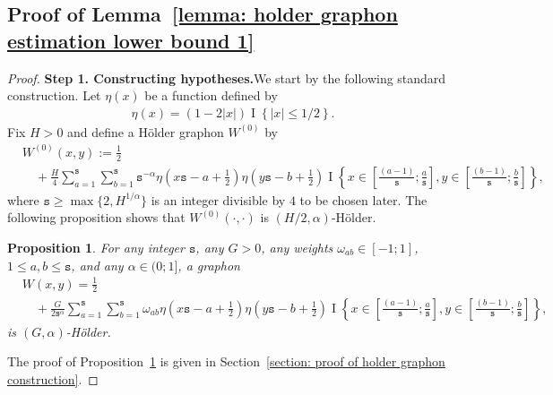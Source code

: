 \documentclass[11pt]{article}
\newcommand{\indicator}[1]{{\operatorname{I} \left \{ #1\right \}}}
\newcommand{\<}{\langle}
\renewcommand{\>}{\rangle}
\newcommand{\ts}{\mathtt{s}}
\theoremstyle{plain}
\newtheorem{prop}{Proposition}
\theoremstyle{definition}
\theoremstyle{remark}
\begin{document}
{\subsection{Proof of Lemma~\ref{lemma: holder graphon estimation lower bound 1}}

\begin{proof}
	\textbf{Step 1. Constructing hypotheses.}We start by the following standard construction. Let $\eta(x)$ be a function defined by
    \begin{align}
    \label{eq: eta definition}
        \eta(x) = (1 - 2|x|) \indicator{|x| \le 1/2}.
    \end{align}
	Fix $H>0$ and define a H\"older graphon $W^{(0)}$ by
	\begin{align*}
	& W^{(0)}(x,y) := \frac12 \\
    & \quad + \frac{H}{4} \sum_{a = 1}^{\ts} \sum_{b =1}^{\ts } \ts^{-\alpha} \eta \left (x\ts - a + \frac{1}{2} \right ) \eta \left ( y \ts - b + \frac{1}{2} \right ) \indicator{x \in \left  [\frac{(a - 1)}{\ts}; \frac{a}{\ts} \right ], y \in \left [\frac{(b - 1)}{\ts}; \frac{b}{\ts}\right ]},
	\end{align*}
    where $\ts \ge \max \{2, H^{1/\alpha}\}$ is an integer divisible by $4$ to be chosen later.
    The following proposition shows that $W^{(0)}(\cdot, \cdot)$ is $(H/2, \alpha)$-H\"older. 
    \begin{prop}
    \label{proposition: Holder graphons construction}
    For any integer $\ts$, any $G > 0$, any weights $\omega_{ab} \in [-1; 1]$, $1 \le a, b \le \ts$, and any $\alpha \in (0; 1]$, a graphon
    \begin{align*}
        & W(x, y) = \frac{1}{2} \\
        & \quad + \frac{G }{2 \ts^{\alpha}} \sum_{a = 1}^{\ts} \sum_{b = 1}^{\ts} \omega_{ab}  \eta \left (x\ts - a + \frac{1}{2} \right ) \eta \left ( y \ts - b + \frac{1}{2} \right ) \indicator{x \in \left  [\frac{(a - 1)}{\ts}; \frac{a}{\ts} \right ], y \in \left [\frac{(b - 1)}{\ts}; \frac{b}{\ts}\right ]},
    \end{align*}
    is $(G, \alpha)$-H\"older.
    \end{prop}
    The proof of Proposition~\ref{proposition: Holder graphons construction} is given in Section~\ref{section: proof of holder graphon construction}.



\end{proof}}
\end{document}
